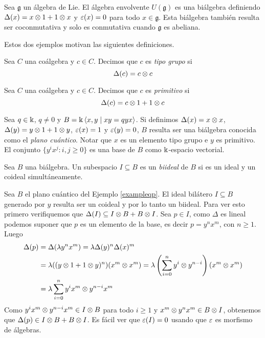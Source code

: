 \documentclass[a4paper,oneside,fleqn,11pt,../tesis.tex]{subfiles}
\begin{document}
\begin{example}
	Sea $\mathfrak{g}$ un álgebra de Lie. El álgebra envolvente $U(\mathfrak{g})$ es una biálgebra definiendo
	$\Delta(x) = x \otimes 1 + 1 \otimes x$ y $\varepsilon(x) = 0$ para todo $x \in \mathfrak{g}$. Esta biálgebra también
	resulta ser coconmutativa y solo es conmutativa cuando $\mathfrak{g}$ es abeliana.
\end{example}

Estos dos ejemplos motivan las siguientes definiciones.

\begin{definition}
	Sea $C$ una coálgebra y $c \in C$. Decimos que $c$ es \emph{tipo grupo}
	si
	\[
		\Delta(c) = c \otimes c
	\]
\end{definition}

\begin{definition}
	Sea $C$ una coálgebra y $c \in C$. Decimos que $c$ es \emph{primitivo}
	si
		\[\Delta(c) = c \otimes 1 + 1 \otimes c\]
\end{definition}

\begin{example}\label{exampleqp}
	Sea $q \in \Bbbk$, $q \neq 0$ y $B = \Bbbk \left\langle x, y \mid xy = qyx \right\rangle$. Si definimos
	$\Delta(x) = x \otimes x$, $\Delta(y) = y \otimes 1 + 1 \otimes y$, $\varepsilon(x) = 1$ y $\varepsilon(y) = 0$, $B$ resulta ser una
	biálgebra conocida como el \emph{plano cuántico}. Notar que $x$ es un elemento tipo grupo e $y$ es primitivo.
	El conjunto $\{ y^ix^j : i, j \geq 0\}$ es una base de $B$ como $\Bbbk$-espacio vectorial.
\end{example}

\begin{definition}
	Sea $B$ una biálgebra. Un subespacio $I \subseteq B$ es un \emph{biideal} de $B$ si es un ideal y un coideal
	simultáneamente.
\end{definition}

\begin{example}
	Sea $B$ el plano cuántico del Ejemplo \ref{exampleqp}. El ideal bilátero $I \subseteq B$ generado por $y$
	resulta ser un coideal y por lo tanto un biideal. Para ver esto
	primero verifiquemos que $\Delta(I) \subseteq I \otimes B + B \otimes I$. Sea $p \in I$, como $\Delta$ es lineal
	podemos suponer que $p$ es un elemento de la base, es decir $p = y^nx^m$, con $n \geq 1$. Luego
	\begin{align*}
		\Delta(p) &= \Delta(	\lambda y^nx^m) = \lambda \Delta(y)^n \Delta(x)^m  \\
		&= \lambda ((y\otimes 1 + 1 \otimes y)^n) (x^m \otimes x^m)
			= \lambda \left(\sum_{i = 0}^n y^i \otimes y^{n - i}\right) (x^m \otimes x^m) \\
		&= \lambda \sum_{i = 0}^n y^ix^m \otimes y^{n - i}x^m 
	\end{align*}
	Como $y^ix^m \otimes y^{n - i}x^m \in I \otimes B$ para todo $i \geq 1$ y $x^m \otimes y^nx^m \in B \otimes I$,
	obtenemos que $\Delta(p) \in I \otimes B + B \otimes I$. Es fácil ver que $\varepsilon(I) = 0$ usando que $\varepsilon$
	es morfismo de álgebras. 
\end{example}
\end{document}
